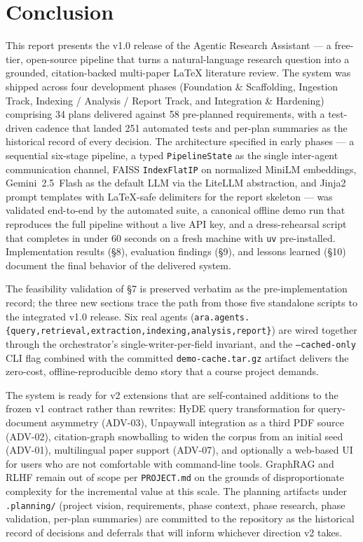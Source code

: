 \documentclass[12pt,a4paper]{article}
\begin{document}
\section{Conclusion}

This report presents the v1.0 release of the Agentic Research Assistant --- a
free-tier, open-source pipeline that turns a natural-language research question
into a grounded, citation-backed multi-paper LaTeX literature review. The system
was shipped across four development phases (Foundation \& Scaffolding,
Ingestion Track, Indexing / Analysis / Report Track, and Integration \& Hardening)
comprising 34 plans delivered against 58 pre-planned requirements, with a
test-driven cadence that landed 251 automated tests and per-plan summaries as the
historical record of every decision. The architecture specified in early phases
--- a sequential six-stage pipeline, a typed \texttt{PipelineState} as the single
inter-agent communication channel, FAISS \texttt{IndexFlatIP} on normalized
MiniLM embeddings, Gemini~2.5~Flash as the default LLM via the LiteLLM
abstraction, and Jinja2 prompt templates with LaTeX-safe delimiters for the
report skeleton --- was validated end-to-end by the automated suite, a canonical
offline demo run that reproduces the full pipeline without a live API key, and a
dress-rehearsal script that completes in under 60 seconds on a fresh machine with
\texttt{uv} pre-installed. Implementation results (\S8), evaluation findings (\S9),
and lessons learned (\S10) document the final behavior of the delivered system.

The feasibility validation of \S7 is preserved verbatim as the pre-implementation
record; the three new sections trace the path from those five standalone scripts
to the integrated v1.0 release. Six real agents
(\texttt{ara.agents.\{query,retrieval,extraction,indexing,analysis,report\}}) are
wired together through the orchestrator's single-writer-per-field invariant, and
the \texttt{--cached-only} CLI flag combined with the committed
\texttt{demo-cache.tar.gz} artifact delivers the zero-cost, offline-reproducible
demo story that a course project demands.

The system is ready for v2 extensions that are self-contained additions to the
frozen v1 contract rather than rewrites: HyDE query transformation for
query-document asymmetry (ADV-03), Unpaywall integration as a third PDF source
(ADV-02), citation-graph snowballing to widen the corpus from an initial seed
(ADV-01), multilingual paper support (ADV-07), and optionally a web-based UI for
users who are not comfortable with command-line tools. GraphRAG and RLHF remain
out of scope per \texttt{PROJECT.md} on the grounds of disproportionate
complexity for the incremental value at this scale. The planning artifacts under
\texttt{.planning/} (project vision, requirements, phase context, phase research,
phase validation, per-plan summaries) are committed to the repository as the
historical record of decisions and deferrals that will inform whichever direction
v2 takes.


\end{document}
